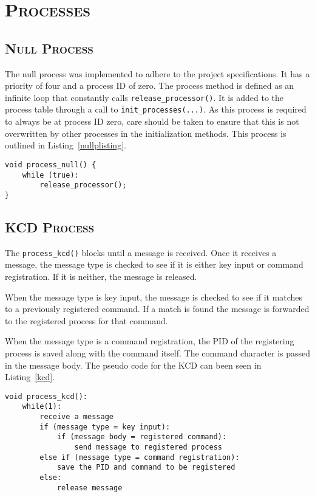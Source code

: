 \documentclass[oneside]{report}
\begin{document}
\section{\textsc{Processes}}
\subsection{\textsc{Null Process}}
The null process was implemented to adhere to the project specifications. It
has a priority of four and a process ID of zero. The process method is defined 
as an infinite loop that constantly calls \texttt{release\_processor()}. It is 
added to the process table through a call to \texttt{init\_processes(...)}. As
this process is required to always be at process ID zero, care should be taken
to ensure that this is not overwritten by other processes in the initialization
methods. This process is outlined in Listing~\ref{nullplisting}.

\begin{lstlisting}
void process_null() {
    while (true):
        release_processor();
}
\end{lstlisting}

\subsection{\textsc{KCD Process}}
The \texttt{process\_kcd()} blocks until a message is received. Once it
receives a message, the message type is checked to see if it is either
key input or command registration. If it is neither, the message is
released. 

When the message type is key input, the message is checked to see if
it matches to a previously registered command. If a match is found the
message is forwarded to the registered process for that command.

When the message type is a command registration, the PID of the
registering process is saved along with the command itself. The
command character is passed in the message body. The pseudo code for
the KCD can been seen in Listing~\ref{kcd}.

\begin{lstlisting}
void process_kcd():
    while(1):
        receive a message
        if (message type = key input):
            if (message body = registered command):
                send message to registered process
        else if (message type = command registration):
            save the PID and command to be registered
        else:
            release message
\end{lstlisting}
\end{document}
